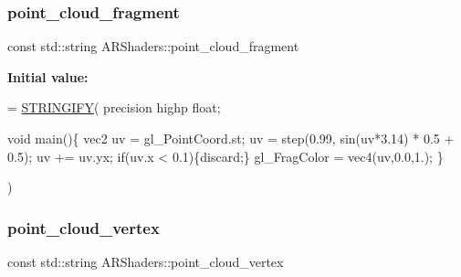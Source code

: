 \subsubsection{\texorpdfstring{point\+\_\+cloud\+\_\+fragment}{point\_cloud\_fragment}}
{\footnotesize\ttfamily const std\+::string A\+R\+Shaders\+::point\+\_\+cloud\+\_\+fragment}

{\bfseries Initial value\+:}
\begin{DoxyCode}
= \hyperlink{_a_r_shaders_8h_ab06e1eb2e9bf38e0d452b1f796aed208}{STRINGIFY}(
                                                   precision highp \textcolor{keywordtype}{float};
                                                   
                                                   
                                                   
                                                   
                                                   \textcolor{keywordtype}{void} main()\{
                                                       vec2 uv = gl\_PointCoord.st;
                                                       uv = step(0.99, sin(uv*3.14) * 0.5 + 0.5);
                                                       uv += uv.yx;
                                                       \textcolor{keywordflow}{if}(uv.x < 0.1)\{discard;\}
                                                       gl\_FragColor = vec4(uv,0.0,1.);
                                                   \}
                                                   
                                                   
                                                   
                                                   )
\end{DoxyCode}
\mbox{\label{namespace_a_r_shaders_ada1162901271506088cc985d466c8971}} 
\subsubsection{\texorpdfstring{point\+\_\+cloud\+\_\+vertex}{point\_cloud\_vertex}}
{\footnotesize\ttfamily const std\+::string A\+R\+Shaders\+::point\+\_\+cloud\+\_\+vertex}

